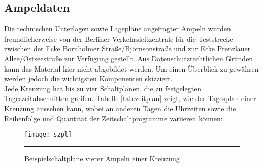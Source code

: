 \subsection{Ampeldaten}
Die technischen Unterlagen sowie Lagepläne angefragter Ampeln wurden freundlicherweise von der Berliner Verkehrsleitzentrale für die Teststrecke zwischen der Ecke Bornholmer Straße/Björnsonstraße und zur Ecke Prenzlauer Allee/Ostseestraße zur Verfügung gestellt. Aus Datenschutzrechtlichen Gründen kann das Material hier nicht abgebildet werden. Um einen Überblick zu gewähren werden jedoch die wichtigsten Komponenten skizziert.\\ 
Jede Kreuzung hat bis zu vier Schaltplänen, die zu festgelegten Tageszeitabschnitten greifen. Tabelle \ref{tab:zeitplan} zeigt, wie der Tagesplan einer Kreuzung aussehen kann, wobei an anderen Tagen die Uhrzeiten sowie die Reihenfolge und Quantität der Zeitschaltprogramme variieren können:
\begin{figure}[H]
\centering
	\begin{minipage}[b]{0.29\textwidth}	
		\label{tab:zeitplan}
	\end{minipage} \hfill
%
	\begin{minipage}[b]{0.6\textwidth}
		\texttt{[image: szpl]}
		\label{fig:plan}
	\end{minipage}
	\rule{35em}{0.5pt}
	\caption{Beispielschaltpläne vierer Ampeln einer Kreuzung}
	
\end{figure}
